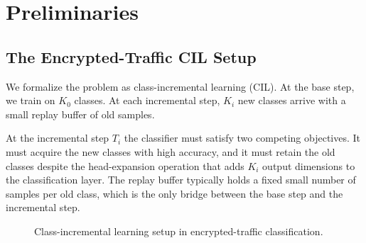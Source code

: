 %
%

\section{Preliminaries}\label{sec:background}


\subsection{The Encrypted-Traffic CIL Setup}

We formalize the problem as class-incremental learning (CIL). At the base step, we train on $K_0$ classes. At each incremental step, $K_i$ new classes arrive with a small replay buffer of old samples.

At the incremental step $T_i$ the classifier must satisfy two competing objectives. It must acquire the new classes with high accuracy, and it must retain the old classes despite the head-expansion operation that adds $K_i$ output dimensions to the classification layer. The replay buffer typically holds a fixed small number of samples per old class, which is the only bridge between the base step and the incremental step.

\begin{figure}[t]
\centering

\caption{Class-incremental learning setup in encrypted-traffic classification.}
\label{fig:cil-setup}
\end{figure}

